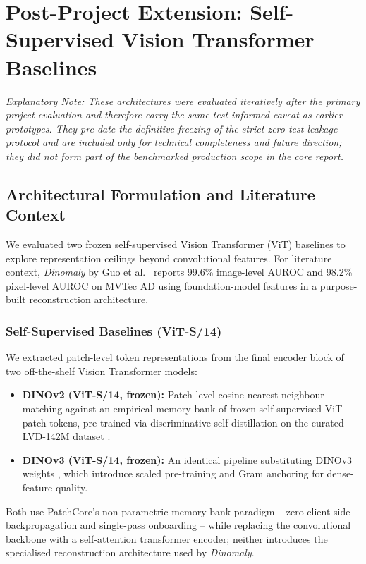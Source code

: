 \appendix
\section{Post-Project Extension: Self-Supervised Vision Transformer Baselines}
\label{app:dino}

\textit{Explanatory Note: These architectures were evaluated iteratively after the primary project evaluation and therefore carry the same test-informed caveat as earlier prototypes. They pre-date the definitive freezing of the strict zero-test-leakage protocol and are included only for technical completeness and future direction; they did not form part of the benchmarked production scope in the core report.}

\subsection{Architectural Formulation and Literature Context}

We evaluated two frozen self-supervised Vision Transformer (ViT) baselines to explore representation ceilings beyond convolutional features. For literature context, \textit{Dinomaly} by Guo et al.\ \cite{guo2024dinomaly} reports 99.6\% image-level AUROC and 98.2\% pixel-level AUROC on MVTec AD using foundation-model features in a purpose-built reconstruction architecture.

\subsubsection{Self-Supervised Baselines (ViT-S/14)}
We extracted patch-level token representations from the final encoder block of two off-the-shelf Vision Transformer models:
\begin{itemize}[leftmargin=1.5em]
    \item \textbf{DINOv2 (ViT-S/14, frozen):} Patch-level cosine nearest-neighbour matching against an empirical memory bank of frozen self-supervised ViT patch tokens, pre-trained via discriminative self-distillation on the curated LVD-142M dataset \cite{oquab2023dinov2}.
    \item \textbf{DINOv3 (ViT-S/14, frozen):} An identical pipeline substituting DINOv3 weights \cite{simeoni2025dinov3}, which introduce scaled pre-training and Gram anchoring for dense-feature quality.
\end{itemize}

Both use PatchCore's non-parametric memory-bank paradigm -- zero client-side backpropagation and single-pass onboarding -- while replacing the convolutional backbone with a self-attention transformer encoder; neither introduces the specialised reconstruction architecture used by \textit{Dinomaly}.

